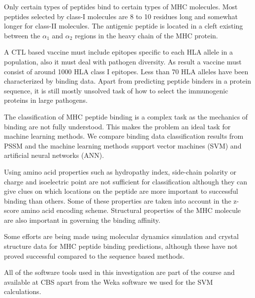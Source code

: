 Only certain types of peptides bind to certain types of MHC molecules. Most peptides selected by class-I molecules are 8 to 10 residues long
and somewhat longer for class-II molecules. The antigenic peptide is located in a cleft existing between the $\alpha_1$ and $\alpha_2$ regions in the heavy chain of the MHC protein.

A CTL based vaccine must include epitopes specific to each HLA allele in a population, also it must deal with pathogen diversity. As result a vaccine must consist of around 1000 HLA class I epitopes.
Less than 70 HLA alleles have been characterized by binding data. Apart from predicting peptide binders in a protein sequence, it is still  mostly unsolved task of how to select the immunogenic proteins in large pathogens.

The classification of MHC peptide binding is a complex task as the mechanics of binding are not fully understood. 
This makes the problem an ideal task for machine learning methods. We compare binding data classification results from PSSM and the machine learning methods support vector machines (SVM) and artificial neural networks (ANN).

Using amino acid properties such as hydropathy index, side-chain polarity or charge and isoelectric point are not sufficient for classification although they can give clues on which locations on the peptide are more important to successful binding than others. 
Some of these properties are taken into account in the z-score amino acid encoding scheme. Structural properties of the MHC molecule are also important in governing the binding affinity.

Some efforts are being made using molecular dynamics simulation and crystal structure\cite{Kumar2010} data for MHC peptide binding predictions, although these have not proved successful compared to the sequence based methods.

All of the software tools used in this investigation are part of the course and available at CBS apart from the Weka software we used for the SVM calculations\cite{Frank2004}.
